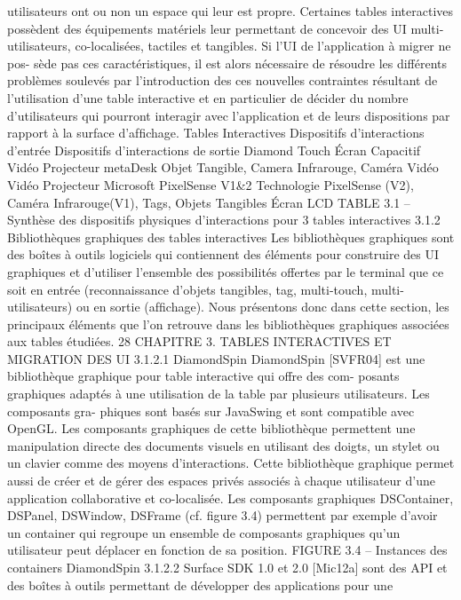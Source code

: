 \documentclass{article}
\begin{document}
utilisateurs ont ou non un espace qui leur est propre.
Certaines tables interactives possèdent des équipements matériels leur permettant de concevoir
des UI multi-utilisateurs, co-localisées, tactiles et tangibles. Si l’UI de l’application à migrer ne pos-
sède pas ces caractéristiques, il est alors nécessaire de résoudre les différents problèmes soulevés
par l’introduction des ces nouvelles contraintes résultant de l’utilisation d’une table interactive et en
particulier de décider du nombre d’utilisateurs qui pourront interagir avec l’application et de leurs
dispositions par rapport à la surface d’afﬁchage.
Tables Interactives
Dispositifs d’interactions
d’entrée
Dispositifs d’interactions de
sortie
Diamond Touch
Écran Capacitif
Vidéo Projecteur
metaDesk
Objet Tangible, Camera
Infrarouge, Caméra Vidéo
Vidéo Projecteur
Microsoft PixelSense V1&2
Technologie PixelSense (V2),
Caméra Infrarouge(V1), Tags,
Objets Tangibles
Écran LCD
TABLE 3.1 – Synthèse des dispositifs physiques d’interactions pour 3 tables interactives
3.1.2
Bibliothèques graphiques des tables interactives
Les bibliothèques graphiques sont des boîtes à outils logiciels qui contiennent des éléments pour
construire des UI graphiques et d’utiliser l’ensemble des possibilités offertes par le terminal que ce
soit en entrée (reconnaissance d’objets tangibles, tag, multi-touch, multi-utilisateurs) ou en sortie
(afﬁchage). Nous présentons donc dans cette section, les principaux éléments que l’on retrouve dans
les bibliothèques graphiques associées aux tables étudiées.
28
CHAPITRE 3. TABLES INTERACTIVES ET MIGRATION DES UI
3.1.2.1
DiamondSpin
DiamondSpin [SVFR04] est une bibliothèque graphique pour table interactive qui offre des com-
posants graphiques adaptés à une utilisation de la table par plusieurs utilisateurs. Les composants gra-
phiques sont basés sur JavaSwing et sont compatible avec OpenGL. Les composants graphiques de
cette bibliothèque permettent une manipulation directe des documents visuels en utilisant des doigts,
un stylet ou un clavier comme des moyens d’interactions. Cette bibliothèque graphique permet aussi
de créer et de gérer des espaces privés associés à chaque utilisateur d’une application collaborative
et co-localisée. Les composants graphiques DSContainer, DSPanel, DSWindow, DSFrame (cf. ﬁgure
3.4) permettent par exemple d’avoir un container qui regroupe un ensemble de composants graphiques
qu’un utilisateur peut déplacer en fonction de sa position.
FIGURE 3.4 – Instances des containers DiamondSpin
3.1.2.2
Surface SDK 1.0 et 2.0
[Mic12a] sont des API et des boîtes à outils permettant de développer des applications pour une
\end{document}
